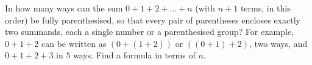 In how many ways can the sum $0+1+2+\dots+n$ (with $n+1$ terms, in this order) be fully parenthesised, so that every pair of parentheses encloses exactly two summands, each a single number or a parenthesised group? For example, $0+1+2$ can be written as $(0+(1+2))$ or $((0+1)+2)$, two ways, and $0+1+2+3$ in $5$ ways. Find a formula in terms of $n$.
